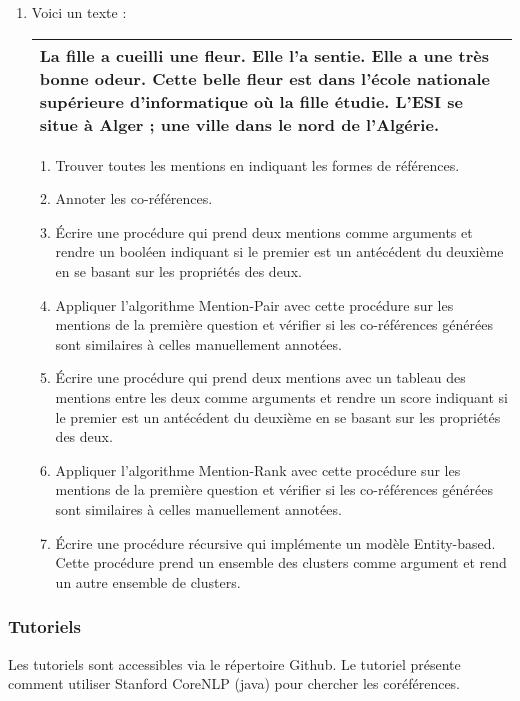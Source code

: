 \documentclass{KodeBook}
\begin{document}
\begin{enumerate}
	\item Voici un texte :
	
	\begin{tabular}{|p{}|}
		\hline
		La fille a cueilli une fleur. 
		Elle l'a sentie. 
		Elle a une très bonne odeur.
		Cette belle fleur est dans l'école nationale supérieure d'informatique où la fille étudie.
		L'ESI se situe à Alger ; une ville dans le nord de l'Algérie.\\
		\hline
	\end{tabular}

	\begin{enumerate}
		\item Trouver toutes les mentions en indiquant les formes de références.
		\item Annoter les co-références.
		\item Écrire une procédure qui prend deux mentions comme arguments et rendre un booléen indiquant si le premier est un antécédent du deuxième en se basant sur les propriétés des deux.
		\item Appliquer l'algorithme Mention-Pair avec cette procédure sur les mentions de la première question et vérifier si les co-références générées sont similaires à celles manuellement annotées.
		\item Écrire une procédure qui prend deux mentions avec un tableau des mentions entre les deux comme arguments et rendre un score indiquant si le premier est un antécédent du deuxième en se basant sur les propriétés des deux.
		\item Appliquer l'algorithme Mention-Rank avec cette procédure sur les mentions de la première question et vérifier si les co-références générées sont similaires à celles manuellement annotées.
		\item Écrire une procédure récursive qui implémente un modèle Entity-based. Cette procédure prend un ensemble des clusters comme argument et rend un autre ensemble de clusters. 
	\end{enumerate}

	
\end{enumerate}

\subsubsection*{Tutoriels}

Les tutoriels sont accessibles via le répertoire Github.
Le tutoriel présente comment utiliser Stanford CoreNLP (java) pour chercher les coréférences.



\ifx\wholebook\relax\else
% 
% 
	
\end{document}
